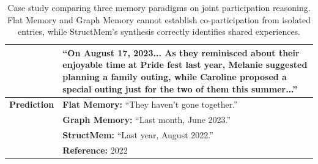 \begin{table}[t]
\begin{tabular}{p{2.5cm}p{13cm}}
& ``On August 17, 2023... \textbf{As they reminisced about their enjoyable time at Pride fest last year}, Melanie suggested planning a family outing, while Caroline proposed a special outing just for the two of them this summer...'' \\
\midrule
\textbf{Prediction} & 
\textbf{Flat Memory:} ``They haven't gone together.'' \\
& \textbf{Graph Memory:} ``Last month, June 2023.'' \\
& \textbf{StructMem:} ``Last year, August 2022.'' \\
& \textbf{Reference:} 2022 \\
\bottomrule
\end{tabular}
\caption{Case study comparing three memory paradigms on joint participation reasoning. Flat Memory and Graph Memory cannot establish co-participation from isolated entries, while StructMem's synthesis correctly identifies shared experiences.}
\label{tab:case_study}
\end{table}